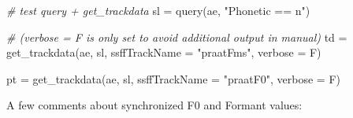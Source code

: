 \documentclass[
]{book}
\newenvironment{Shaded}{\begin{snugshade}}{\end{snugshade}}
\newcommand{\AttributeTok}[1]{\textcolor[rgb]{0.77,0.63,0.00}{#1}}
\newcommand{\CommentTok}[1]{\textcolor[rgb]{0.56,0.35,0.01}{\textit{#1}}}
\newcommand{\FunctionTok}[1]{\textcolor[rgb]{0.00,0.00,0.00}{#1}}
\newcommand{\NormalTok}[1]{#1}
\newcommand{\OtherTok}[1]{\textcolor[rgb]{0.56,0.35,0.01}{#1}}
\newcommand{\StringTok}[1]{\textcolor[rgb]{0.31,0.60,0.02}{#1}}
\begin{document}
\begin{Shaded}
\begin{Highlighting}[]
\CommentTok{\# test query + get\_trackdata}
\NormalTok{sl }\OtherTok{=} \FunctionTok{query}\NormalTok{(ae, }\StringTok{"Phonetic == n"}\NormalTok{)}

\CommentTok{\# (verbose = F is only set to avoid additional output in manual)}
\NormalTok{td }\OtherTok{=} \FunctionTok{get\_trackdata}\NormalTok{(ae,}
\NormalTok{                   sl,}
                   \AttributeTok{ssffTrackName =} \StringTok{"praatFms"}\NormalTok{,}
                   \AttributeTok{verbose =}\NormalTok{ F)}

\NormalTok{pt }\OtherTok{=} \FunctionTok{get\_trackdata}\NormalTok{(ae,}
\NormalTok{                   sl,}
                   \AttributeTok{ssffTrackName =} \StringTok{"praatF0"}\NormalTok{,}
                   \AttributeTok{verbose =}\NormalTok{ F)}
\end{Highlighting}
\end{Shaded}

A few comments about synchronized F0 and Formant values:
\end{document}
